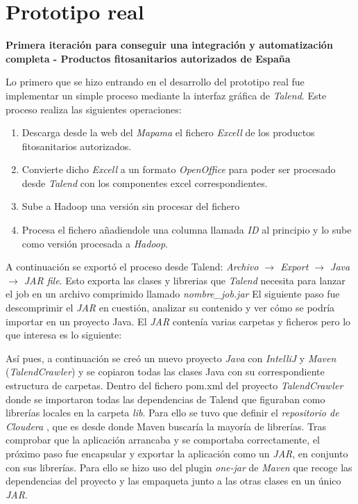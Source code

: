 \section{Prototipo real} \label{implementacion.prototipo}
\par 
\textbf{Primera iteración para conseguir una integración y automatización completa - Productos fitosanitarios autorizados de España}
\bigskip
\par Lo primero que se hizo entrando en el desarrollo del prototipo real fue implementar un simple proceso mediante la interfaz gráfica de \textit{Talend}. Este proceso realiza las siguientes operaciones: 
\begin{enumerate}
\item Descarga desde la web del \textit{Mapama} el fichero \textit{Excell} de los productos fitosanitarios autorizados.
\item Convierte dicho \textit{Excell} a un formato \textit{OpenOffice} para poder ser procesado desde \textit{Talend} con los componentes excel correspondientes. 
\item Sube a Hadoop una versión sin procesar del fichero
\item Procesa el fichero añadiendole una columna llamada \textit{ID} al principio y lo sube como versión procesada a \textit{Hadoop}. 
\end{enumerate} 

A continuación se exportó el proceso desde Talend: 
\textit{Archivo $\rightarrow$ Export $\rightarrow$ Java $\rightarrow$ JAR file}. Esto exporta las clases y librerias que \textit{Talend} necesita para lanzar el job en un archivo comprimido llamado \textit{nombre\_job.jar}
El siguiente paso fue descomprimir el \textit{JAR} en cuestión, analizar su contenido y ver cómo se podría importar en un proyecto Java. El \textit{JAR} contenía varias carpetas y ficheros pero lo que interesa es lo siguiente:
\bigskip
\par 
{}
\bigskip
\par
Así pues, a continuación se creó un nuevo proyecto \textit{Java} con \textit{IntelliJ} y \textit{Maven} (\textit{TalendCrawler}) y se copiaron todas las clases Java con su correspondiente estructura de carpetas. Dentro del fichero pom.xml del proyecto \textit{TalendCrawler} donde se importaron todas las dependencias de Talend que figuraban como librerías locales en la carpeta \textit{lib}. Para ello se tuvo que definir el \textit{repositorio de Cloudera} \cite{cloudera}, que es desde donde Maven buscaría la mayoría de librerías. Tras comprobar que la aplicación arrancaba y se comportaba correctamente, el próximo paso fue encapsular y exportar la aplicación como un \textit{JAR}, en conjunto con sus librerías. Para ello se hizo uso del plugin \textit{one-jar} de \textit{Maven} que recoge las dependencias del proyecto y las empaqueta junto a las otras clases en un único \textit{JAR}.\par 

